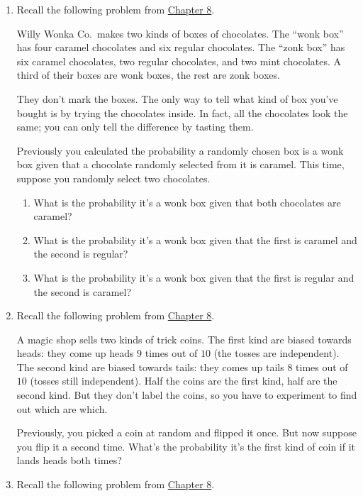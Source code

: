 \documentclass[justified]{tufte-book}
\providecommand{\tightlist}{%
  \setlength{\itemsep}{0pt}\setlength{\parskip}{0pt}}
\theoremstyle{definition}
\theoremstyle{definition}
\theoremstyle{definition}
\theoremstyle{remark}
\begin{document}
\begin{enumerate}
\item
  Recall the following problem from \protect\hyperlink{bayes-theorem}{Chapter 8}.

  Willy Wonka Co.~makes two kinds of boxes of chocolates. The ``wonk box'' has four caramel chocolates and six regular chocolates. The ``zonk box'' has six caramel chocolates, two regular chocolates, and two mint chocolates. A third of their boxes are wonk boxes, the rest are zonk boxes.

  They don't mark the boxes. The only way to tell what kind of box you've bought is by trying the chocolates inside. In fact, all the chocolates look the same; you can only tell the difference by tasting them.

  Previously you calculated the probability a randomly chosen box is a wonk box given that a chocolate randomly selected from it is caramel. This time, suppose you randomly select two chocolates.

  \begin{enumerate}
  \def\labelenumii{\alph{enumii}.}
  \tightlist
  \item
    What is the probability it's a wonk box given that both chocolates are caramel?
  \item
    What is the probability it's a wonk box given that the first is caramel and the second is regular?
  \item
    What is the probability it's a wonk box given that the first is regular and the second is caramel?
  \end{enumerate}
\item
  Recall the following problem from \protect\hyperlink{bayes-theorem}{Chapter 8}.

  A magic shop sells two kinds of trick coins. The first kind are biased towards heads: they come up heads \(9\) times out of \(10\) (the tosses are independent). The second kind are biased towards tails: they comes up tails \(8\) times out of \(10\) (tosses still independent). Half the coins are the first kind, half are the second kind. But they don't label the coins, so you have to experiment to find out which are which.

  Previously, you picked a coin at random and flipped it once. But now suppose you flip it a second time. What's the probability it's the first kind of coin if it lands heads both times?
\item
  Recall the following problem from \protect\hyperlink{bayes-theorem}{Chapter 8}.


\end{enumerate}
\end{document}

